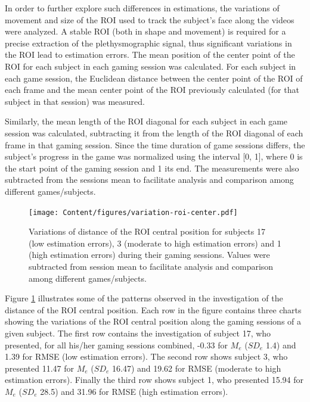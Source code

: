 In order to further explore such differences in estimations, the variations of movement and size of the ROI used to track the subject's face along the videos were analyzed. A stable ROI (both in shape and movement) is required for a precise extraction of the plethysmographic signal, thus significant variations in the ROI lead to estimation errors. The mean position of the center point of the ROI for each subject in each gaming session was calculated. For each subject in each game session, the Euclidean distance between the center point of the ROI of each frame and the mean center point of the ROI previously calculated (for that subject in that session) was measured.

Similarly, the mean length of the ROI diagonal for each subject in each game session was calculated, subtracting it from the length of the ROI diagonal of each frame in that gaming session. Since the time duration of game sessions differs, the subject's progress in the game was normalized using the interval [0, 1], where 0 is the start point of the gaming session and 1 its end. The measurements were also subtracted from the sessions mean to facilitate analysis and comparison among different games/subjects.

\begin{figure}[!h]
\centering
\texttt{[image: Content/figures/variation-roi-center.pdf]}
\caption{Variations of distance of the ROI central position for subjects 17 (low estimation errors), 3 (moderate to high estimation errors) and 1 (high estimation errors) during their gaming sessions. Values were subtracted from session mean to facilitate analysis and comparison among different games/subjects.}
\label{fig:chart-roi-anomalies-center}
\end{figure}

Figure \ref{fig:chart-roi-anomalies-center} illustrates some of the patterns observed in the investigation of the distance of the ROI central position. Each row in the figure contains three charts showing the variations of the ROI central position along the gaming sessions of a given subject. The first row contains the investigation of subject 17, who presented, for all his/her gaming sessions combined, -0.33 for $M_e$ ($SD_e$ 1.4) and 1.39 for RMSE (low estimation errors). The second row shows subject 3, who presented 11.47 for $M_e$ ($SD_e$ 16.47) and 19.62 for RMSE (moderate to high estimation errors). Finally the third row shows subject 1, who presented 15.94 for $M_e$ ($SD_e$ 28.5) and 31.96 for RMSE (high estimation errors).

